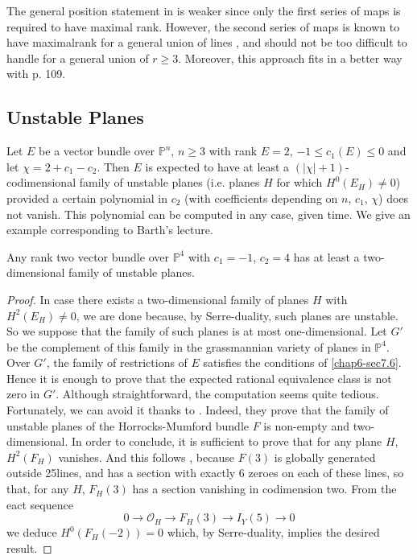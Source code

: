 \begin{remark*}
The general position statement in \cite{chap6-HH2} is weaker since
only the first series of maps is required to have maximal
rank. However, the second series of maps is known to have
maximal\pageoriginale rank for a general union of
lines \cite{chap6-HH1}, and should not be too difficult to handle for
a general union of $r\geq 3$. Moreover, this approach fits in a better
way with \cite{chap6-H3} p. 109.
\end{remark*}

\subsection{Unstable Planes}\label{chap6-sec8.4}

Let $E$ be a vector bundle over $\mathbb{P}^{n}$, $n\geq 3$ with rank
$E=2$, $-1\leq c_{1}(E)\leq 0$ and let $\chi=2+c_{1}-c_{2}$. Then $E$
is expected to have at least a $(|\chi|+1)$-codimensional family of
unstable planes (i.e. planes $H$ for which $H^{0}(E_{H})\neq 0$)
provided a certain polynomial in $c_{2}$ (with coefficients depending
on $n$, $c_{1}$, $\chi$) does not vanish. This polynomial can be
computed in any case, given time. We give an example corresponding to
Barth's lecture.

\begin{prop*}
Any rank two vector bundle over $\mathbb{P}^{4}$ with $c_{1}=-1$,
$c_{2}=4$ has at least a two-dimensional family of unstable planes. 
\end{prop*}

\begin{proof}
In case there exists a two-dimensional family of planes $H$ with
$H^{2}(E_{H})\neq 0$, we are done because, by Serre-duality, such
planes are unstable. So we suppose that the family of such planes is
at most one-dimensional. Let $G'$ be the complement of this family in
the grassmannian variety of planes in $\mathbb{P}^{4}$. Over $G'$, the
family of restrictions of $E$ satisfies the conditions
of \ref{chap6-sec7.6}. Hence it is enough to prove that the expected
rational equivalence class is not zero in $G'$. Although
straightforward, the computation seems quite tedious. Fortunately, we
can avoid it thanks to \cite{chap6-BHM}. Indeed, they prove that the
family of unstable planes of the Horrocks-Mumford bundle $F$ is
non-empty and two-dimensional. In order to conclude, it is sufficient
to prove that for any plane $H$, $H^{2}(F_{H})$ vanishes. And this
follows \cite{chap6-Hu2}, because $F(3)$ is globally generated outside
25\pageoriginale lines, and has a section with exactly 6 zeroes on
each of these lines, so that, for any $H$, $F_{H}(3)$ has a section
vanishing in codimension two. From the eact sequence
$$
0\to \mathscr{O}_{H}\to F_{H}(3)\to I_{Y}(5)\to 0
$$
we deduce $H^{0}(F_{H}(-2))=0$ which, by Serre-duality, implies the
desired result. 
\end{proof}

